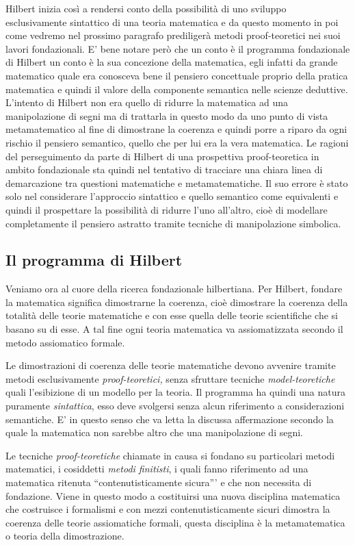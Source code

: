 Hilbert inizia così a rendersi conto della possibilità di uno sviluppo
esclusivamente sintattico di una teoria matematica e da questo momento
in poi come vedremo nel prossimo paragrafo prediligerà metodi proof-teoretici
nei suoi lavori fondazionali. E' bene notare però che un conto è il
programma fondazionale di Hilbert un conto è la sua concezione della
matematica, egli infatti da grande matematico quale era conosceva
bene il pensiero concettuale proprio della pratica matematica e quindi
il valore della componente semantica nelle scienze deduttive. L'intento
di Hilbert non era quello di ridurre la matematica ad una manipolazione
di segni ma di trattarla in questo modo da uno punto di vista metamatematico
al fine di dimostrane la coerenza e quindi porre a riparo da ogni
rischio il pensiero semantico, quello che per lui era la vera matematica.
Le ragioni del perseguimento da parte di Hilbert di una prospettiva
proof-teoretica in ambito fondazionale sta quindi nel tentativo di
tracciare una chiara linea di demarcazione tra questioni matematiche
e metamatematiche. Il suo errore è stato solo nel considerare l'approccio
sintattico e quello semantico come equivalenti e quindi il prospettare
la possibilità di ridurre l'uno all'altro, cioè di modellare completamente
il pensiero astratto tramite tecniche di manipolazione simbolica.


\subsection{Il programma di Hilbert}

Veniamo ora al cuore della ricerca fondazionale hilbertiana. Per Hilbert,
fondare la matematica significa dimostrarne la coerenza, cioè dimostrare
la coerenza della totalità delle teorie matematiche e con esse quella
delle teorie scientifiche che si basano su di esse. A tal fine ogni
teoria matematica va assiomatizzata secondo il metodo assiomatico
formale. 

Le dimostrazioni di coerenza delle teorie matematiche devono avvenire
tramite metodi esclusivamente \emph{proof-teoretici, }senza sfruttare
tecniche \emph{model-teoretiche }quali l'esibizione di un modello
per la teoria. Il programma ha quindi una natura puramente \emph{sintattica},
esso deve svolgersi senza alcun riferimento a considerazioni semantiche.
E' in questo senso che va letta la discussa affermazione secondo la
quale la matematica non sarebbe altro che una manipolazione di segni. 

Le tecniche \emph{proof-teoretiche }chiamate in causa si fondano su
particolari metodi matematici, i cosiddetti \emph{metodi finitisti},
i quali fanno riferimento ad una matematica ritenuta {}``contenutisticamente
sicura''' e che non necessita di fondazione. Viene in questo modo
a costituirsi una nuova disciplina matematica che costruisce i formalismi
e con mezzi contenutisticamente sicuri dimostra la coerenza delle
teorie assiomatiche formali, questa disciplina è la metamatematica
o teoria della dimostrazione.

